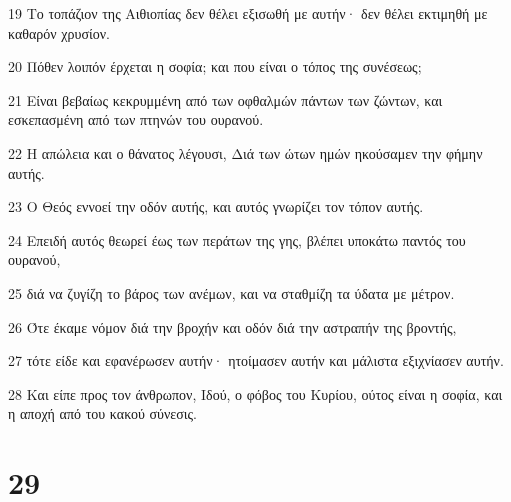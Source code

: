 \par 19 Το τοπάζιον της Αιθιοπίας δεν θέλει εξισωθή με αυτήν· δεν θέλει εκτιμηθή με καθαρόν χρυσίον.
\par 20 Πόθεν λοιπόν έρχεται η σοφία; και που είναι ο τόπος της συνέσεως;
\par 21 Είναι βεβαίως κεκρυμμένη από των οφθαλμών πάντων των ζώντων, και εσκεπασμένη από των πτηνών του ουρανού.
\par 22 Η απώλεια και ο θάνατος λέγουσι, Διά των ώτων ημών ηκούσαμεν την φήμην αυτής.
\par 23 Ο Θεός εννοεί την οδόν αυτής, και αυτός γνωρίζει τον τόπον αυτής.
\par 24 Επειδή αυτός θεωρεί έως των περάτων της γης, βλέπει υποκάτω παντός του ουρανού,
\par 25 διά να ζυγίζη το βάρος των ανέμων, και να σταθμίζη τα ύδατα με μέτρον.
\par 26 Ότε έκαμε νόμον διά την βροχήν και οδόν διά την αστραπήν της βροντής,
\par 27 τότε είδε και εφανέρωσεν αυτήν· ητοίμασεν αυτήν και μάλιστα εξιχνίασεν αυτήν.
\par 28 Και είπε προς τον άνθρωπον, Ιδού, ο φόβος του Κυρίου, ούτος είναι η σοφία, και η αποχή από του κακού σύνεσις.

\chapter{29}


